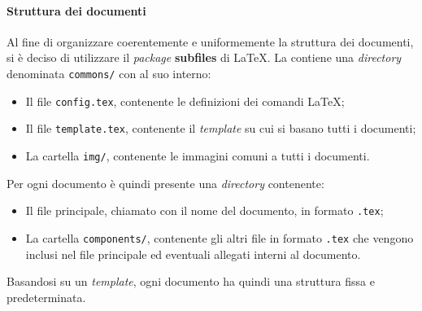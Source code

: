 \documentclass[../norme-di-progetto.tex]{subfiles}
\begin{document}
\paragraph{Struttura dei documenti}
Al fine di organizzare coerentemente e uniformemente la struttura dei documenti, si è deciso di utilizzare il \textit{package} \textbf{subfiles} di \LaTeX. La  contiene una \textit{directory} denominata \texttt{commons/} con al suo interno:
\begin{itemize}
  \item Il file \texttt{config.tex}, contenente le definizioni dei comandi \LaTeX;
  \item Il file \texttt{template.tex}, contenente il \textit{template} su cui si basano tutti i documenti;
  \item La cartella \texttt{img/}, contenente le immagini comuni a tutti i documenti.
\end{itemize}
Per ogni documento è quindi presente una \textit{directory} contenente:
\begin{itemize}
  \item  Il file principale, chiamato con il nome del documento, in formato \texttt{.tex};
  \item La cartella \texttt{components/}, contenente gli altri file in formato \texttt{.tex} che vengono inclusi nel file principale ed eventuali allegati interni al documento.
\end{itemize}
Basandosi su un \textit{template}, ogni documento ha quindi una struttura fissa e predeterminata.
\end{document}
